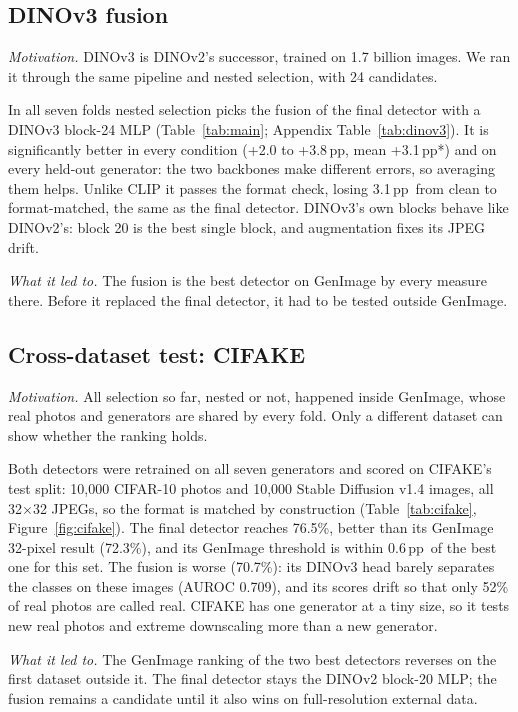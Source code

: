 \documentclass[10pt,a4paper]{article}
\newcommand{\pp}{\,pp}
\newcommand{\why}[1]{\noindent\textit{\color{ntublue}Motivation.} #1\par}
\newcommand{\ledto}[1]{\par\noindent\textit{\color{ntublue}What it led to.} #1\par}
\begin{document}
\subsection{DINOv3 fusion}\label{sec:res-dinov3}
\why{DINOv3 is DINOv2's successor, trained on 1.7 billion images. We ran it through the same pipeline and nested selection, with 24 candidates.}
In all seven folds nested selection picks the fusion of the final detector with a DINOv3 block-24 MLP (Table~\ref{tab:main}; Appendix Table~\ref{tab:dinov3}). It is significantly better in every condition (+2.0 to +3.8\pp, mean +3.1\pp*) and on every held-out generator: the two backbones make different errors, so averaging them helps. Unlike CLIP it passes the format check, losing 3.1\pp\ from clean to format-matched, the same as the final detector. DINOv3's own blocks behave like DINOv2's: block 20 is the best single block, and augmentation fixes its JPEG drift.
\ledto{The fusion is the best detector on GenImage by every measure there. Before it replaced the final detector, it had to be tested outside GenImage.}

\subsection{Cross-dataset test: CIFAKE}\label{sec:res-cifake}
\why{All selection so far, nested or not, happened inside GenImage, whose real photos and generators are shared by every fold. Only a different dataset can show whether the ranking holds.}
Both detectors were retrained on all seven generators and scored on CIFAKE's test split: 10,000 CIFAR-10 photos and 10,000 Stable Diffusion v1.4 images, all 32$\times$32 JPEGs, so the format is matched by construction (Table~\ref{tab:cifake}, Figure~\ref{fig:cifake}). The final detector reaches 76.5\%, better than its GenImage 32-pixel result (72.3\%), and its GenImage threshold is within 0.6\pp\ of the best one for this set. The fusion is worse (70.7\%): its DINOv3 head barely separates the classes on these images (AUROC 0.709), and its scores drift so that only 52\% of real photos are called real. CIFAKE has one generator at a tiny size, so it tests new real photos and extreme downscaling more than a new generator.
\ledto{The GenImage ranking of the two best detectors reverses on the first dataset outside it. The final detector stays the DINOv2 block-20 MLP; the fusion remains a candidate until it also wins on full-resolution external data.}
\end{document}
